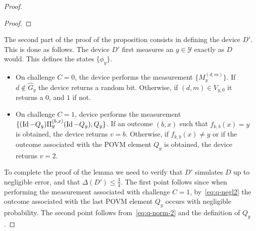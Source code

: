 \documentclass[11pt]{article}
\theoremstyle{remark}
\theoremstyle{definition}
\newcommand{\Tr}{\mbox{\rm Tr}}
\newcommand{\Id}{\ensuremath{\mathop{\rm Id}\nolimits}}
\newcommand{\mY}{\ensuremath{\mathcal{Y}}}
\DeclareMathOperator{\negl}{negl}
\newcommand{\dset}{G}
\begin{document}
\begin{proof}
\begin{proof}
%
\end{proof}

The second part of the proof of the proposition consists in defining the device $D'$. This is done as follows. The device $D'$ first measures an $y\in\mY$ exactly as $D$ would. This defines the states $\{\phi_y\}$. %
\begin{itemize}
\item On challenge $C=0$, the device performs the measurement $\{M_y^{(d,m)}\}$. If $d\notin \hat{\dset}_y$ the device returns a random bit. Otherwise, if $(d,m)\in V_{y,0}$ it returns a $0$, and $1$ if not. %
\item On challenge $C=1$, device performs the measurement $\{(\Id-Q_y)\Pi_y^{(b,x)}(\Id-Q_y),Q_y\}$. If an outcome $(b,x)$ such that $f_{k,b}(x)=y$ is obtained, the device returns $v=b$. Otherwise, if $f_{k,b}(x)\neq y$ or if the outcome associated with the POVM element $Q_y$ is obtained, the device returns $v=2$. 
\end{itemize}
To complete the proof of the lemma we need to verify that $D'$ simulates $D$ up to negligible error, and that $\Delta(D') \leq \frac{3}{4}$. The first point follows since when performing the measurement associated with challenge $C=1$, by~\eqref{eq:q-negl2} the outcome associated with the last POVM element $Q_y$ occurs with negligible probability. 
The second point follows from~\eqref{eq:q-norm-2} and the definition of $Q_y$.
\end{proof}
\end{document}
